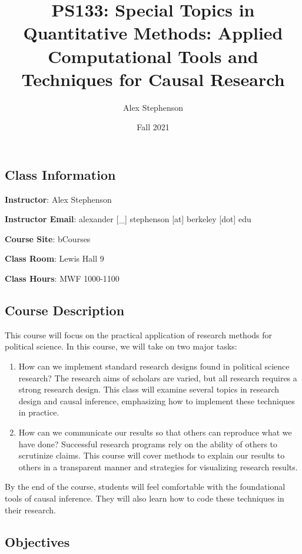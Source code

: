 \documentclass[
  11pt,
]{article}
\title{PS133: Special Topics in Quantitative Methods: Applied
Computational Tools and Techniques for Causal Research}
\author{Alex Stephenson}
\date{Fall 2021}
\begin{document}
\maketitle

\hypertarget{class-information}{%
\subsection{Class Information}\label{class-information}}

\textbf{Instructor}: Alex Stephenson

\textbf{Instructor Email}: alexander {[}\_{]} stephenson {[}at{]}
berkeley {[}dot{]} edu

\textbf{Course Site}: bCourses

\textbf{Class Room}: Lewis Hall 9

\textbf{Class Hours}: MWF 1000-1100

\hypertarget{course-description}{%
\subsection{Course Description}\label{course-description}}

This course will focus on the practical application of research methods
for political science. In this course, we will take on two major tasks:

\begin{enumerate}
\def\labelenumi{\arabic{enumi}.}
\item
  How can we implement standard research designs found in political
  science research? The research aims of scholars are varied, but all
  research requires a strong research design. This class will examine
  several topics in research design and causal inference, emphasizing
  how to implement these techniques in practice.
\item
  How can we communicate our results so that others can reproduce what
  we have done? Successful research programs rely on the ability of
  others to scrutinize claims. This course will cover methods to explain
  our results to others in a transparent manner and strategies for
  visualizing research results.
\end{enumerate}

By the end of the course, students will feel comfortable with the
foundational tools of causal inference. They will also learn how to code
these techniques in their research.

\hypertarget{objectives}{%
\subsection{Objectives}\label{objectives}}
\end{document}
